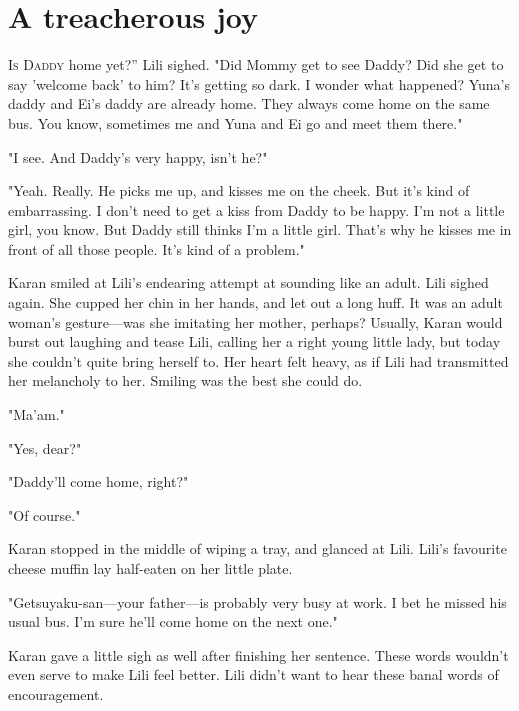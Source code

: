 
\chapter{A treacherous joy}


\lettrine[ante=``]{I}{s Daddy} home yet?'' Lili sighed. "Did Mommy get to see Daddy? Did she
get to say 'welcome back' to him? It's getting so dark. I wonder what
happened? Yuna's daddy and Ei's daddy are already home. They always come
home on the same bus. You know, sometimes me and Yuna and Ei go and meet
them there."

"I see. And Daddy's very happy, isn't he?"

"Yeah. Really. He picks me up, and kisses me on the cheek. But it's kind
of embarrassing. I don't need to get a kiss from Daddy to be happy. I'm
not a little girl, you know. But Daddy still thinks I'm a little girl.
That's why he kisses me in front of all those people. It's kind of a
problem."

Karan smiled at Lili's endearing attempt at sounding like an adult. Lili
sighed again. She cupped her chin in her hands, and let out a long huff.
It was an adult woman's gesture---was she imitating her mother, perhaps?
Usually, Karan would burst out laughing and tease Lili, calling her a
right young little lady, but today she couldn't quite bring herself to.
Her heart felt heavy, as if Lili had transmitted her melancholy to her.
Smiling was the best she could do.

"Ma'am."

"Yes, dear?"

"Daddy'll come home, right?"

"Of course."

Karan stopped in the middle of wiping a tray, and glanced at Lili.
Lili's favourite cheese muffin lay half-eaten on her little plate.

"Getsuyaku-san---your father---is probably very busy at work. I bet he
missed his usual bus. I'm sure he'll come home on the next one."

Karan gave a little sigh as well after finishing her sentence. These
words wouldn't even serve to make Lili feel better. Lili didn't want to
hear these banal words of encouragement.

